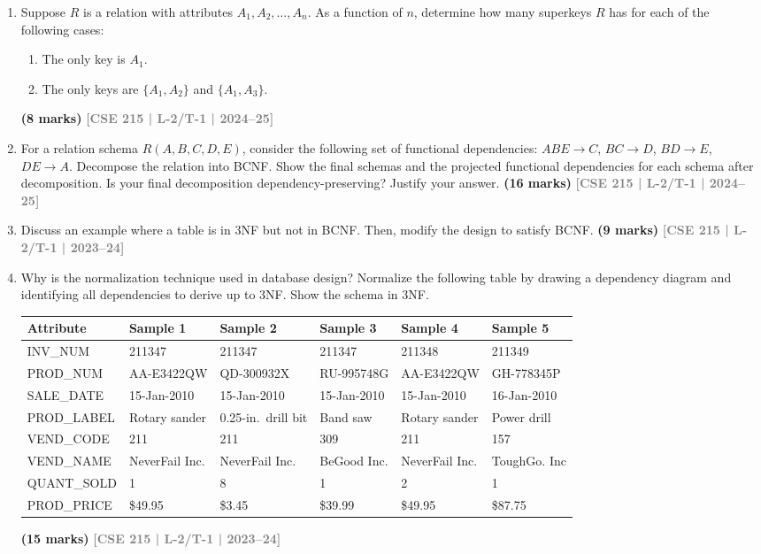 \documentclass[12pt]{article}
\newcommand{\yr}[1]{\hfill\textcolor{gray}{\small\textbf{[#1]}}}
\newcommand{\mk}[1]{\textcolor{orange!70!black}{\small\textbf{(#1 marks)}}}
\begin{document}
\begin{enumerate}

\item Suppose $R$ is a relation with attributes $A_1, A_2, \ldots, A_n$. As a function of $n$, determine how many superkeys $R$ has for each of the following cases:
\begin{enumerate}
  \item The only key is $A_1$.
  \item The only keys are $\{A_1, A_2\}$ and $\{A_1, A_3\}$.
\end{enumerate}
\mk{8} \yr{CSE 215 | L-2/T-1 | 2024--25}


\item For a relation schema $R(A,B,C,D,E)$, consider the following set of functional dependencies: $ABE \to C$, $BC \to D$, $BD \to E$, $DE \to A$. Decompose the relation into BCNF. Show the final schemas and the projected functional dependencies for each schema after decomposition. Is your final decomposition dependency-preserving? Justify your answer.
\mk{16} \yr{CSE 215 | L-2/T-1 | 2024--25}


\item Discuss an example where a table is in 3NF but not in BCNF. Then, modify the design to satisfy BCNF.
\mk{9} \yr{CSE 215 | L-2/T-1 | 2023--24}


\item Why is the normalization technique used in database design? Normalize the following table by drawing a dependency diagram and identifying all dependencies to derive up to 3NF. Show the schema in 3NF.

\medskip
\begin{center}
\small
\begin{tabular}{llllll}
\toprule
\textbf{Attribute} & \textbf{Sample 1} & \textbf{Sample 2} & \textbf{Sample 3} & \textbf{Sample 4} & \textbf{Sample 5}\\
\midrule
INV\_NUM    & 211347 & 211347 & 211347 & 211348 & 211349\\
PROD\_NUM   & AA-E3422QW & QD-300932X & RU-995748G & AA-E3422QW & GH-778345P\\
SALE\_DATE  & 15-Jan-2010 & 15-Jan-2010 & 15-Jan-2010 & 15-Jan-2010 & 16-Jan-2010\\
PROD\_LABEL & Rotary sander & 0.25-in.\ drill bit & Band saw & Rotary sander & Power drill \\
VEND\_CODE  & 211 & 211 & 309 & 211 & 157\\
VEND\_NAME  & NeverFail Inc. & NeverFail Inc. & BeGood Inc. & NeverFail Inc. & ToughGo. Inc\\
QUANT\_SOLD & 1 & 8 & 1 & 2 & 1\\
PROD\_PRICE & \$49.95 & \$3.45 & \$39.99 & \$49.95 & \$87.75\\
\bottomrule
\end{tabular}
\end{center}
\mk{15} \yr{CSE 215 | L-2/T-1 | 2023--24}



\end{enumerate}
\end{document}
